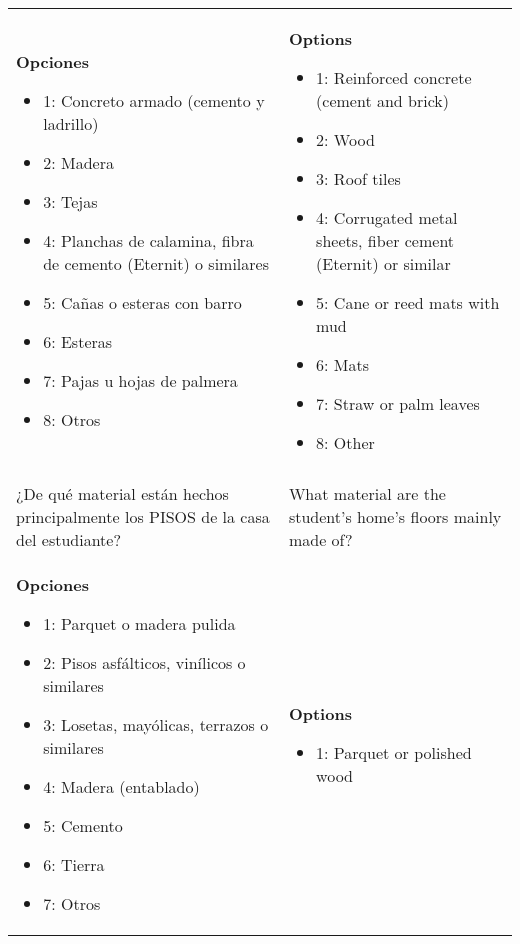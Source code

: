 \documentclass[11pt]{article}
\begin{document}
\begin{longtable}{@{}LL@{}}
\textbf{Opciones}\par\begin{itemize}[leftmargin=*]\item 1: Concreto armado (cemento y ladrillo)
\item 2: Madera
\item 3: Tejas
\item 4: Planchas de calamina, fibra de cemento (Eternit) o similares
\item 5: Cañas o esteras con barro
\item 6: Esteras
\item 7: Pajas u hojas de palmera
\item 8: Otros\end{itemize} & \textbf{Options}\par\begin{itemize}[leftmargin=*]\item 1: Reinforced concrete (cement and brick)
\item 2: Wood
\item 3: Roof tiles
\item 4: Corrugated metal sheets, fiber cement (Eternit) or similar
\item 5: Cane or reed mats with mud
\item 6: Mats
\item 7: Straw or palm leaves
\item 8: Other\end{itemize} \\
\addlinespace[4pt]
 \\ 
¿De qué material están hechos principalmente los PISOS de la casa del estudiante? & What material are the student's home's floors mainly made of? \\
\textbf{Opciones}\par\begin{itemize}[leftmargin=*]\item 1: Parquet o madera pulida
\item 2: Pisos asfálticos, vinílicos o similares
\item 3: Losetas, mayólicas, terrazos o similares
\item 4: Madera (entablado)
\item 5: Cemento
\item 6: Tierra
\item 7: Otros\end{itemize} & \textbf{Options}\par\begin{itemize}[leftmargin=*]\item 1: Parquet or polished wood

\end{itemize}
\end{longtable}
\end{document}
